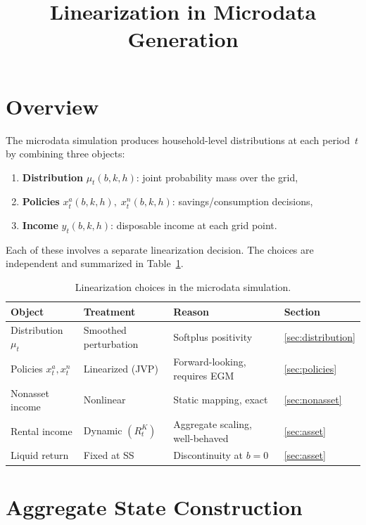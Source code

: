 \documentclass[11pt]{article}
\title{Linearization in Microdata Generation}
\date{}
\begin{document}
\maketitle

\section{Overview}

The microdata simulation produces household-level distributions at each period~$t$
by combining three objects:
\begin{enumerate}[label=(\roman*)]
    \item \textbf{Distribution} $\mu_t(b,k,h)$: joint probability mass over the grid,
    \item \textbf{Policies} $x^a_t(b,k,h),\; x^n_t(b,k,h)$: savings/consumption decisions,
    \item \textbf{Income} $y_t(b,k,h)$: disposable income at each grid point.
\end{enumerate}
Each of these involves a separate linearization decision.
The choices are independent and summarized in Table~\ref{tab:summary}.

\begin{table}[h]
\centering
\begin{tabular}{@{}llll@{}}
\toprule
Object & Treatment & Reason & Section \\
\midrule
Distribution $\mu_t$ & Smoothed perturbation & Softplus positivity & \ref{sec:distribution} \\
Policies $x^a_t, x^n_t$ & Linearized (JVP) & Forward-looking, requires EGM & \ref{sec:policies} \\
Nonasset income & Nonlinear & Static mapping, exact & \ref{sec:nonasset} \\
Rental income & Dynamic $(R^K_t)$ & Aggregate scaling, well-behaved & \ref{sec:asset} \\
Liquid return & Fixed at SS & Discontinuity at $b=0$ & \ref{sec:asset} \\
\bottomrule
\end{tabular}
\caption{Linearization choices in the microdata simulation.}
\label{tab:summary}
\end{table}

\section{Aggregate State Construction}
\end{document}
